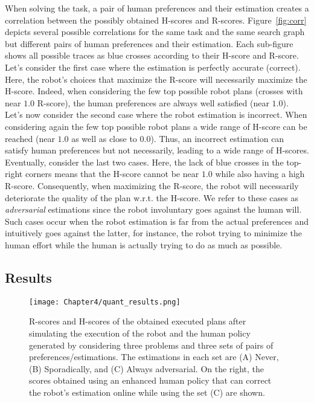 When solving the task, a pair of human preferences and their estimation creates a correlation between the possibly obtained H-scores and R-scores. Figure~\ref{fig:corr} depicts several possible correlations for the same task and the same search graph but different pairs of human preferences and their estimation. Each sub-figure shows all possible traces as blue crosses according to their H-score and R-score. 
Let's consider the first case where the estimation is perfectly accurate (correct). Here, the robot's choices that maximize the R-score will necessarily maximize the H-score. Indeed, when considering the few top possible robot plans (crosses with near $1.0$ R-score), the human preferences are always well satisfied (near $1.0$). 
Let's now consider the second case where the robot estimation is incorrect. When considering again the few top possible robot plans a wide range of H-score can be reached (near $1.0$ as well as close to $0.0$). Thus, an incorrect estimation can satisfy human preferences but not necessarily, leading to a wide range of H-scores.
Eventually, consider the last two cases. Here, the lack of blue crosses in the top-right corners means that the H-score cannot be near $1.0$ while also having a high R-score. Consequently, when maximizing the R-score, the robot will necessarily deteriorate the quality of the plan w.r.t. the H-score. We refer to these cases as \textit{adversarial} estimations since the robot involuntary goes against the human will. Such cases occur when the robot estimation is far from the actual preferences and intuitively goes against the latter, for instance, the robot trying to minimize the human effort while the human is actually trying to do as much as possible.  

    \subsection{Results}

\begin{figure}
    \centering
    \texttt{[image: Chapter4/quant\_results.png]}
    \caption{
    R-scores and H-scores of the obtained executed plans after simulating the execution of the robot and the human policy generated by considering three problems and three sets of pairs of preferences/estimations. 
    The estimations in each set are (A) Never, (B) Sporadically, and (C) Always adversarial. On the right, the scores obtained using an enhanced human policy that can correct the robot's estimation online while using the set (C) are shown.
    }    
    \label{fig:heatmaps}
\end{figure}

